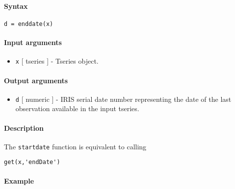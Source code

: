 


	\paragraph{Syntax}\label{syntax}

\begin{verbatim}
d = enddate(x)
\end{verbatim}

\paragraph{Input arguments}\label{input-arguments}

\begin{itemize}
\itemsep1pt\parskip0pt
\item
  \texttt{x} {[} tseries {]} - Tseries object.
\end{itemize}

\paragraph{Output arguments}\label{output-arguments}

\begin{itemize}
\itemsep1pt\parskip0pt
\item
  \texttt{d} {[} numeric {]} - IRIS serial date number representing the
  date of the last observation available in the input tseries.
\end{itemize}

\paragraph{Description}\label{description}

The \texttt{startdate} function is equivalent to calling

\begin{verbatim}
get(x,'endDate')
\end{verbatim}

\paragraph{Example}\label{example}



